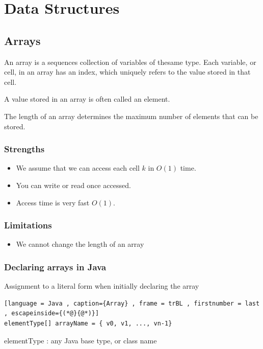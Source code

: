 \documentclass[a4paper]{article}
\theoremstyle{plain}
\theoremstyle{definition}
\newtheorem{defn}{Definition}[section]
\theoremstyle{remark}
\begin{document}
\section{Data Structures}

\subsection{Arrays}
\begin{tcolorbox}[colback=black!3!white,colframe=black!60!white,title=\begin{defn}Array \label{Array}\end{defn}]
An array is a sequences collection of variables of thesame type. Each variable, or cell, in an array has an index, which uniquely refers to the value stored in that cell.

A value stored in an array is often called an element.

The length of an array determines the maximum number of elements that can be stored.
\end{tcolorbox}
\subsubsection{Strengths}
\begin{itemize}
	\item We assume that we can access each cell $k$ in $O(1)$ time.
	\item You can write or read once accessed.
	\item Access time is very fast $O(1)$.
\end{itemize}
\subsubsection{Limitations}
\begin{itemize}
	\item We cannot change the length of an array
\end{itemize}
\subsubsection{Declaring arrays in Java}
Assignment to a literal form when initially declaring the array
\begin{lstlisting}[language = Java , caption={Array} , frame = trBL , firstnumber = last , escapeinside={(*@}{@*)}]
elementType[] arrayName = { v0, v1, ..., vn-1}
\end{lstlisting}
elementType : any Java base type, or class name
\end{document}
